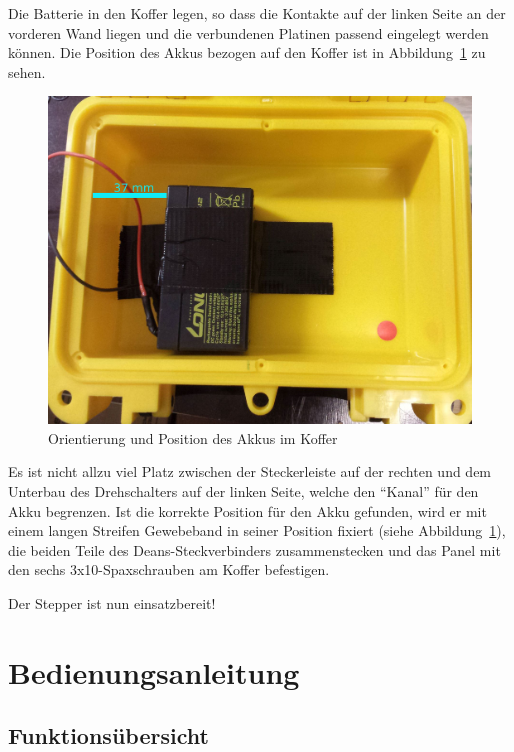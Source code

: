 \documentclass[paper=a4, open=any]{scrbook}
\begin{document}
			Die Batterie in den Koffer legen, so dass die Kontakte auf der linken Seite an der vorderen Wand liegen und die verbundenen Platinen passend eingelegt werden können. Die Position des Akkus bezogen auf den Koffer ist in Abbildung~\ref{fig:akkuposition} zu sehen.

			\begin{figure}
				\centering\includegraphics[width=.9\textwidth]{Akkuposition}
				\caption{Orientierung und Position des Akkus im Koffer}
				\label{fig:akkuposition}
			\end{figure}

			Es ist nicht allzu viel Platz zwischen der Steckerleiste auf der rechten und dem Unterbau des Drehschalters auf der linken Seite, welche den \enquote{Kanal} für den Akku begrenzen. Ist die korrekte Position für den Akku gefunden, wird er mit einem langen Streifen Gewebeband in seiner Position fixiert (siehe Abbildung~\ref{fig:akkuposition}), die beiden Teile des Deans-Steckverbinders zusammenstecken und das Panel mit den sechs 3x10-Spaxschrauben am Koffer befestigen.

			\begin{center}
				Der Stepper ist nun einsatzbereit!
			\end{center}
			\cleardoublepage\part{Bedienungsanleitung}

	\chapter{Funktionsübersicht}
\end{document}
